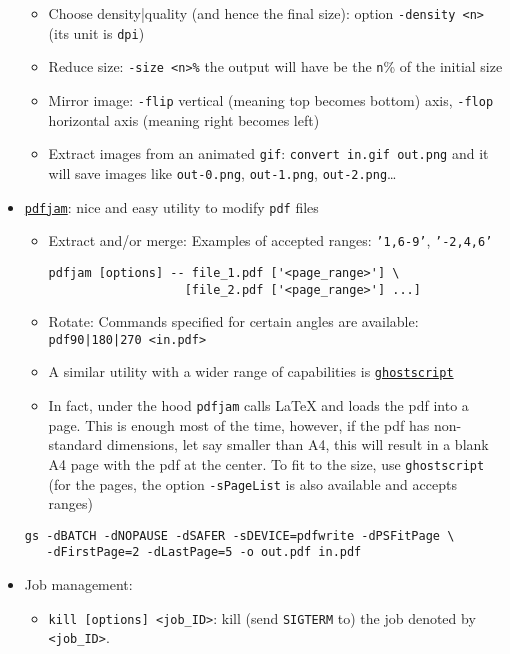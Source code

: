 \documentclass[a4paper,12pt,%
              final%
              ]{article}
\begin{document}
\begin{itemize}
\begin{itemize}
      \item Choose density|quality (and hence the final size): option \verb|-density <n>| (its unit is \texttt{dpi})
      \item Reduce size: \verb|-size <n>%| the output will have be the \verb|n|\% of the initial size
      \item Mirror image: \verb|-flip| vertical (meaning top becomes bottom) axis, \verb|-flop| horizontal axis (meaning right becomes left)
      \item Extract images from an animated \texttt{gif}: \verb|convert in.gif out.png| and it will save images like \texttt{out-0.png}, \texttt{out-1.png}, \texttt{out-2.png}\ldots
    \end{itemize}
  \item \href{https://github.com/DavidFirth/pdfjam#using}{\texttt{pdfjam}}: nice and easy utility to modify \texttt{pdf} files
    \begin{itemize}
      \item Extract and/or merge: Examples of accepted ranges: \texttt{'1,6-9'}, \texttt{'-2,4,6'}
\begin{verbatim}
pdfjam [options] -- file_1.pdf ['<page_range>'] \
                   [file_2.pdf ['<page_range>'] ...]
\end{verbatim}
      \item Rotate: Commands specified for certain angles are available: \verb!pdf90|180|270 <in.pdf>!
      \item A similar utility with a wider range of capabilities is \href{https://www.ghostscript.com/doc/current/Use.htm}{\texttt{ghostscript}}
      \item In fact, under the hood \texttt{pdfjam} calls \LaTeX{} and loads the pdf into a page. This is enough most of the time, however, if the pdf has non-standard dimensions, let say smaller than A4, this will result in a blank A4 page with the pdf at the center. To fit to the size, use \texttt{ghostscript} (for the pages, the option \texttt{-sPageList} is also available and accepts ranges)
    \end{itemize}
\begin{verbatim}
gs -dBATCH -dNOPAUSE -dSAFER -sDEVICE=pdfwrite -dPSFitPage \
   -dFirstPage=2 -dLastPage=5 -o out.pdf in.pdf
\end{verbatim}
  \item Job management:
    \begin{itemize}
      \item \verb|kill [options] <job_ID>|: kill (send \texttt{SIGTERM} to) the job denoted by \verb|<job_ID>|.

\end{itemize}
\end{itemize}
\end{document}
